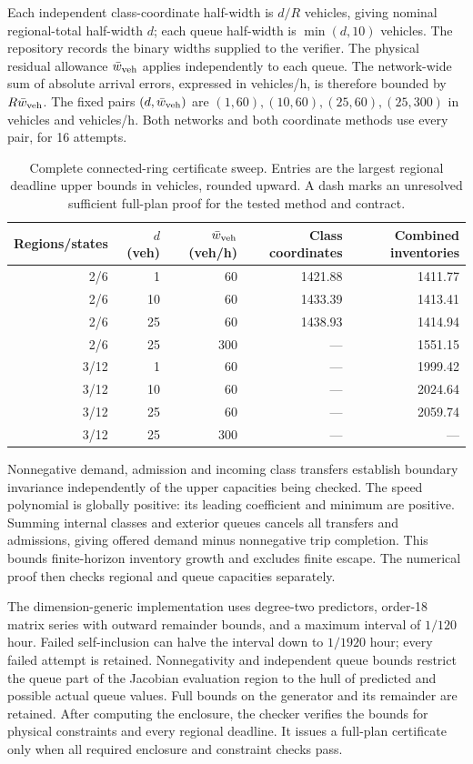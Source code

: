 \documentclass[journal,10pt]{IEEEtran}
\begin{document}
Each independent class-coordinate half-width is $d/R$ vehicles, giving nominal
regional-total half-width $d$; each queue half-width is $\min(d,10)$ vehicles.
The repository records the binary widths supplied to the verifier. The physical
residual allowance $\bar w_{\rm veh}$ applies independently to each queue.
The network-wide sum of absolute arrival errors, expressed in vehicles/h,
is therefore bounded by $R\bar w_{\rm veh}$. The fixed pairs
$(d,\bar w_{\rm veh})$ are $(1,60),(10,60),(25,60),(25,300)$ in vehicles and vehicles/h.
Both networks and both coordinate methods use every pair, for 16 attempts.
\begin{table}[t]
\centering\small
\caption{Complete connected-ring certificate sweep. Entries are the largest
regional deadline upper bounds in vehicles, rounded upward. A dash marks an
unresolved sufficient full-plan proof for the tested method and contract.}
\label{tab:network-transfer-complete}
\setlength{\tabcolsep}{4pt}
\begin{tabular}{@{}rrrrr@{}}
\toprule
Regions/states & $d$ (veh) & $\bar w_{\rm veh}$ (veh/h) & Class coordinates & Combined inventories\\
\midrule
2/6 & 1 & 60 & 1421.88 & 1411.77\\
2/6 & 10 & 60 & 1433.39 & 1413.41\\
2/6 & 25 & 60 & 1438.93 & 1414.94\\
2/6 & 25 & 300 & --- & 1551.15\\
3/12 & 1 & 60 & --- & 1999.42\\
3/12 & 10 & 60 & --- & 2024.64\\
3/12 & 25 & 60 & --- & 2059.74\\
3/12 & 25 & 300 & --- & ---\\
\bottomrule
\end{tabular}
\end{table}

Nonnegative demand, admission and incoming class transfers establish boundary
invariance independently of the upper capacities being checked. The speed
polynomial is globally positive: its leading coefficient and minimum are
positive. Summing internal classes and exterior queues cancels all transfers
and admissions, giving offered demand minus nonnegative trip completion.
This bounds finite-horizon inventory growth and excludes finite escape.
The numerical proof then checks regional and queue capacities separately.

The dimension-generic implementation uses degree-two predictors, order-18
matrix series with outward remainder bounds, and a maximum interval of
$1/120$ hour. Failed self-inclusion can halve the interval down to $1/1920$
hour; every failed attempt is retained. Nonnegativity and independent queue bounds restrict the queue part of the
Jacobian evaluation region to the hull of predicted and possible actual
queue values. Full bounds on the generator and its remainder are retained. After computing the enclosure, the checker verifies the bounds for physical
constraints and every regional deadline. It issues a full-plan certificate
only when all required enclosure and constraint checks pass.
\end{document}
